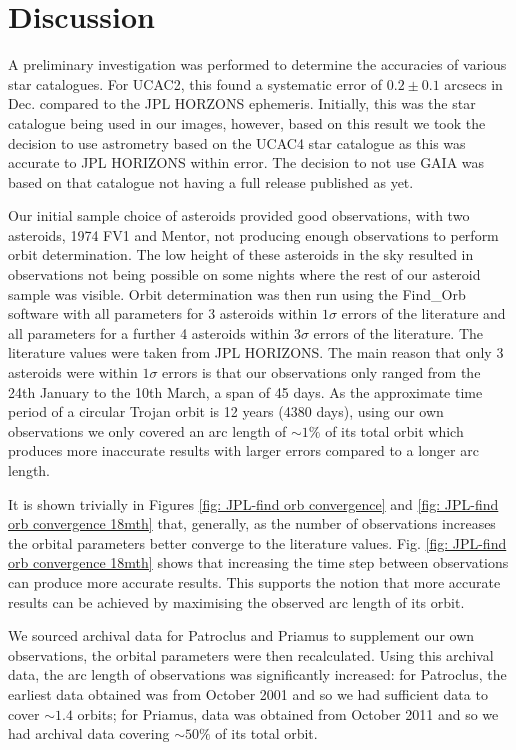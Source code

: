 \documentclass[10pt, twocolumn]{revtex4}    %
\begin{document}
\section{Discussion}

A preliminary investigation was performed to determine the accuracies of various star catalogues. For UCAC2, this found a systematic error of $0.2\pm0.1$ arcsecs in Dec. compared to the JPL HORZONS ephemeris. Initially, this was the star catalogue being used in our images, however, based on this result we took the decision to use astrometry based on the UCAC4 star catalogue as this was accurate to JPL HORIZONS within error. The decision to not use GAIA was based on that catalogue not having a full release published as yet. 

Our initial sample choice of asteroids provided good observations, with two asteroids, 1974 FV1 and Mentor, not producing enough observations to perform orbit determination. The low height of these asteroids in the sky resulted in observations not being possible on some nights where the rest of our asteroid sample was visible. Orbit determination was then run using the Find\_Orb software with all parameters for 3 asteroids within $1\sigma$ errors of the literature and all parameters for a further 4 asteroids within $3\sigma$ errors of the literature. The literature values were taken from JPL HORIZONS. The main reason that only 3 asteroids were within $1\sigma$ errors is that our observations only ranged from the 24th January to the 10th March, a span of 45 days. As the approximate time period of a circular Trojan orbit is 12 years (4380 days), using our own observations we only covered an arc length of ${\sim}1\%$ of its total orbit which produces more inaccurate results with larger errors compared to a longer arc length.

It is shown trivially in Figures \ref{fig: JPL-find orb convergence} and \ref{fig: JPL-find orb convergence 18mth} that, generally, as the number of observations increases the orbital parameters better converge to the literature values. Fig. \ref{fig: JPL-find orb convergence 18mth} shows that increasing the time step between observations can produce more accurate results. This supports the notion that more accurate results can be achieved by maximising the observed arc length of its orbit.

We sourced archival data for Patroclus and Priamus to supplement our own observations, the orbital parameters were then recalculated. Using this archival data, the arc length of observations was significantly increased: for Patroclus, the earliest data obtained was from October 2001 and so we had sufficient data to cover ${\sim}1.4$ orbits; for Priamus, data was obtained from October 2011 and so we had archival data covering ${\sim}50\%$ of its total orbit.
\end{document}
